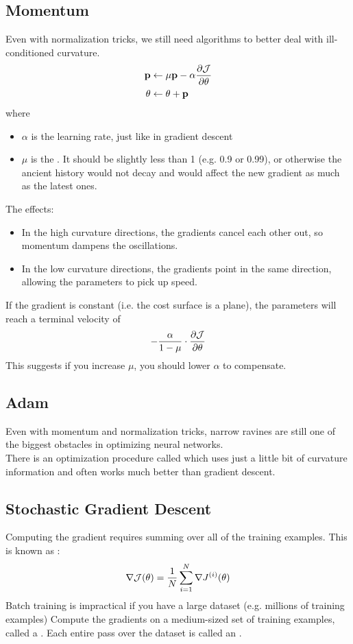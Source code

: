 \documentclass[11pt]{article}
\begin{document}
    \subsection{Momentum}
	Even with normalization tricks, we still need algorithms to better deal with ill-conditioned curvature.\\
	\begin{align*}
		\textbf{p} &\leftarrow \mu \textbf{p}  - \alpha \frac{\partial \mathcal{J}}{\partial \theta}\\
		\theta &\leftarrow \theta + \textbf{p}
	\end{align*}
	where
	\begin{itemize}
		\item $\alpha$ is the learning rate, just like in gradient descent
		\item $\mu$ is the . It should be slightly less than 1 (e.g. 0.9 or 0.99), or otherwise the ancient history would not decay and would affect the new gradient as much as the latest ones.
	\end{itemize}
	The effects:
	\begin{itemize}
		\item In the high curvature directions, the gradients cancel each other out, so momentum dampens the oscillations.
		\item In the low curvature directions, the gradients point in the same direction, allowing the parameters to pick up speed.
	\end{itemize}
	\remark
	If the gradient is constant (i.e. the cost surface is a plane), the parameters will reach a terminal velocity of 
	$$- \frac{\alpha}{1- \mu} \cdot \frac{\partial \mathcal{J}}{\partial \theta}$$
	This suggests if you increase $\mu$, you should lower $\alpha$ to compensate.
	\subsection{Adam}
	Even with momentum and normalization tricks, narrow ravines are still one of the biggest obstacles in optimizing neural networks.\\
	There is an optimization procedure called  which uses just a little bit of curvature information and often works much better than gradient descent.
	\subsection{Stochastic Gradient Descent}
	Computing the gradient requires summing over all of the training examples. This is known as :
	$$\nabla \mathcal{J}(\theta) = \frac{1}{N}\sum_{i=1}^N \nabla J^{(i)}(\theta)$$
	\remark
	Batch training is impractical if you have a large dataset (e.g. millions of training examples)
	Compute the gradients on a medium-sized set of training examples, called a .
	Each entire pass over the dataset is called an .
\end{document}

